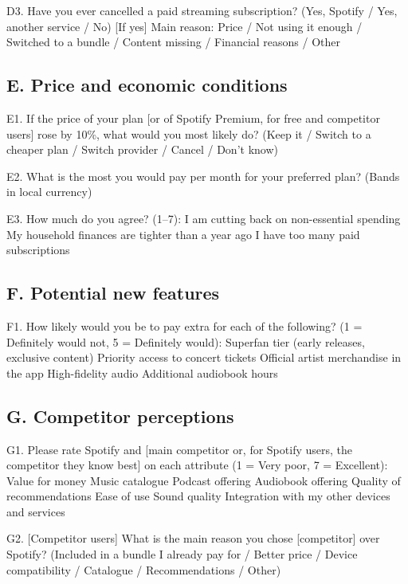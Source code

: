 \documentclass[11pt,a4paper]{article}
\begin{document}
D3. Have you ever cancelled a paid streaming subscription? (Yes, Spotify / Yes, another service / No) [If yes] Main reason: Price / Not using it enough / Switched to a bundle / Content missing / Financial reasons / Other

\subsection*{E. Price and economic conditions}
E1. If the price of your plan [or of Spotify Premium, for free and competitor users] rose by 10\%, what would you most likely do? (Keep it / Switch to a cheaper plan / Switch provider / Cancel / Don't know)

E2. What is the most you would pay per month for your preferred plan? (Bands in local currency)

E3. How much do you agree? (1–7): I am cutting back on non-essential spending \textperiodcentered{} My household finances are tighter than a year ago \textperiodcentered{} I have too many paid subscriptions

\subsection*{F. Potential new features}
F1. How likely would you be to pay extra for each of the following? (1 = Definitely would not, 5 = Definitely would): Superfan tier (early releases, exclusive content) \textperiodcentered{} Priority access to concert tickets \textperiodcentered{} Official artist merchandise in the app \textperiodcentered{} High-fidelity audio \textperiodcentered{} Additional audiobook hours

\subsection*{G. Competitor perceptions}
G1. Please rate Spotify and [main competitor or, for Spotify users, the competitor they know best] on each attribute (1 = Very poor, 7 = Excellent): Value for money \textperiodcentered{} Music catalogue \textperiodcentered{} Podcast offering \textperiodcentered{} Audiobook offering \textperiodcentered{} Quality of recommendations \textperiodcentered{} Ease of use \textperiodcentered{} Sound quality \textperiodcentered{} Integration with my other devices and services

G2. [Competitor users] What is the main reason you chose [competitor] over Spotify? (Included in a bundle I already pay for / Better price / Device compatibility / Catalogue / Recommendations / Other)
\end{document}
